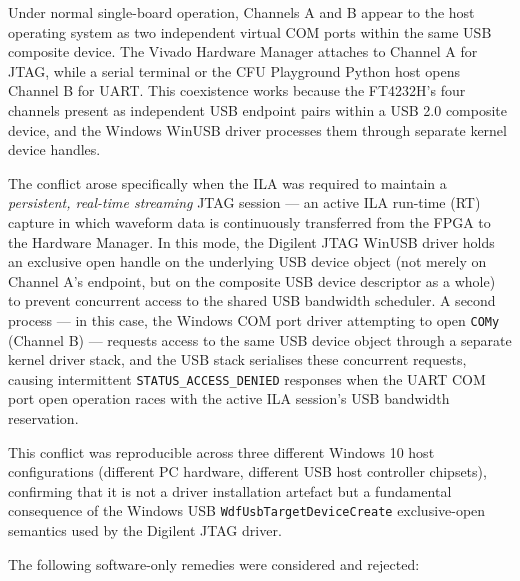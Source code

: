 Under normal single-board operation, Channels A and B appear to the host operating system as two independent virtual COM ports within the same USB composite device. The Vivado Hardware Manager attaches to Channel A for JTAG, while a serial terminal or the CFU Playground Python host opens Channel B for UART. This coexistence works because the FT4232H's four channels present as independent USB endpoint pairs within a USB 2.0 composite device, and the Windows WinUSB driver processes them through separate kernel device handles.

The conflict arose specifically when the ILA was required to maintain a \textit{persistent, real-time streaming} JTAG session — an active ILA run-time (RT) capture in which waveform data is continuously transferred from the FPGA to the Hardware Manager. In this mode, the Digilent JTAG WinUSB driver holds an exclusive open handle on the underlying USB device object (not merely on Channel A's endpoint, but on the composite USB device descriptor as a whole) to prevent concurrent access to the shared USB bandwidth scheduler. A second process — in this case, the Windows COM port driver attempting to open \texttt{COMy} (Channel B) — requests access to the same USB device object through a separate kernel driver stack, and the USB stack serialises these concurrent requests, causing intermittent \texttt{STATUS\_ACCESS\_DENIED} responses when the UART COM port open operation races with the active ILA session's USB bandwidth reservation.

This conflict was reproducible across three different Windows 10 host configurations (different PC hardware, different USB host controller chipsets), confirming that it is not a driver installation artefact but a fundamental consequence of the Windows USB \texttt{WdfUsbTargetDeviceCreate} exclusive-open semantics used by the Digilent JTAG driver.

The following software-only remedies were considered and rejected:

